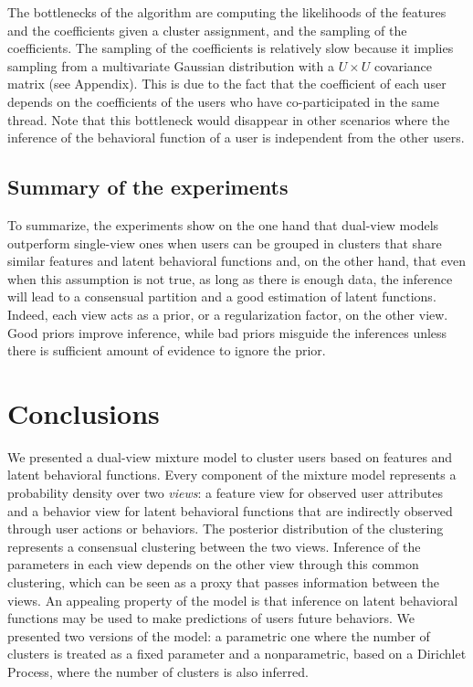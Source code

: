 \documentclass[smallextended]{svjour3}          %
\begin{document}

The bottlenecks of the algorithm are computing the likelihoods of the features and the coefficients given a cluster assignment, and the sampling of the coefficients. The sampling of the coefficients is relatively slow because it implies sampling from a multivariate Gaussian distribution with a $U\times U$ covariance matrix (see Appendix). This is due to the fact that the coefficient of each user depends on the coefficients of the users who have co-participated in the same thread. Note that this bottleneck would disappear in other scenarios where the inference of the behavioral function of a user is independent from the other users.


\subsection{Summary of the experiments}
To summarize, the experiments show on the one hand that dual-view models outperform single-view ones when users can be grouped in clusters that share similar features and latent behavioral functions and, on the other hand, that even when this assumption is not true, as long as there is enough data, the inference will lead to a consensual partition and a good estimation of latent functions. Indeed, each view acts as a prior, or a regularization factor, on the other view. Good priors improve inference, while bad priors misguide the inferences unless there is sufficient amount of evidence to ignore the prior.

\section{Conclusions}\label{sec:conclusions}

We presented a dual-view mixture model to cluster users based on features and latent behavioral functions. Every component of the mixture model represents a probability density over two \textit{views}: a feature view for observed user attributes and a
behavior view for latent behavioral functions that are indirectly observed through user actions or behaviors. The posterior distribution of the clustering represents a consensual clustering between the two views. Inference of the parameters in each view depends on the other view through this common clustering, which can be seen as a proxy that passes information between the views. An appealing property of the model is that inference on latent behavioral functions may be used to make predictions of users future behaviors. We presented two versions of the model: a parametric one where the number of clusters is treated as a fixed parameter and a nonparametric, based on a Dirichlet Process, where the number of clusters is also inferred.
\end{document}
